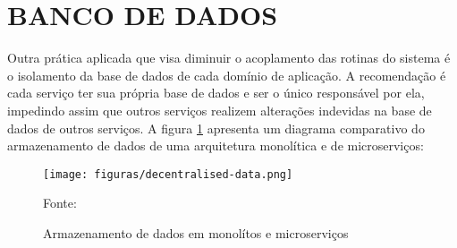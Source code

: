 \section{BANCO DE DADOS}

Outra prática aplicada que visa diminuir o acoplamento das rotinas do sistema
é o isolamento da base de dados de cada domínio de aplicação. A recomendação é
cada serviço ter sua própria base de dados e ser o único responsável por ela,
impedindo assim que outros serviços realizem alterações indevidas na base de
dados de outros serviços. A figura \ref{fig:db-monolith-microservices}
apresenta um diagrama comparativo do armazenamento de dados de uma arquitetura
monolítica e de microserviços:

\begin{figure}[H]
	\centering
	\caption{Armazenamento de dados em monolítos e microserviços}
	\texttt{[image: figuras/decentralised-data.png]}

	\label{fig:db-monolith-microservices}
	\footnotesize Fonte: 
\end{figure}
